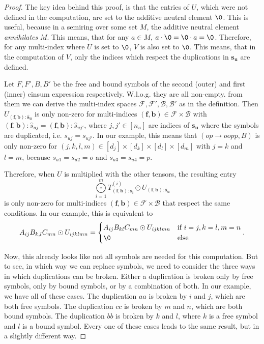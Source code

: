 \begin{proof}
    \small
    The key idea behind this proof, is that the entries of $U$, which were not defined in the computation, are set to the additive neutral element $\0$.
    This is useful, because in a semiring over some set $M$, the additive neutral element \textit{annihilates} $M$.
    This means, that for any $a \in M$, $a \cdot \0 = \0 \cdot a = \0$.
    Therefore, for any multi-index where $U$ is set to $\0$, $V$ is also set to $\0$.
    This means, that in the computation of $V$, only the indices which respect the duplications in $\bm{s_u}$ are defined.

    Let $F, F', B, B'$ be the free and bound symbols of the second (outer) and first (inner) einsum expression respectively.
    W.l.o.g. they are all non-empty.
    from them we can derive the multi-index spaces $\mathcal{F}, \mathcal{F}', \mathcal{B}, \mathcal{B}'$ as in the definition.
    Then $U_{(\bm{f}, \bm{b}): \bm{\hat{s}_u}}$ is only non-zero for multi-indices $(\bm{f}, \bm{b}) \in \mathcal{F} \times \mathcal{B}$ with $(\bm{f}, \bm{b}):\hat{s}_{uj} = (\bm{f}, \bm{b}):\hat{s}_{uj'}$, where $j,j' \in [n_u]$ are indices of $\bm{s_u}$ where the symbols are duplicated, i.e. $s_{uj} = s_{uj'}$.
    In our example, this means that $(op \rightarrow oopp, B)$ is only non-zero for $(j,k,l,m) \in [d_j] \times [d_k] \times [d_l] \times [d_m]$ with $j = k$ and $l = m$, because $s_{u1} = s_{u2} = o$ and $s_{u3} = s_{u4} = p$.

    Therefore, when $U$ is multiplied with the other tensors, the resulting entry
    $$\bigodot\limits_{i = 1}^{m} T^{(i)}_{(\bm{f}, \bm{b}): \bm{s_i}} \odot U_{(\bm{f}, \bm{b}): \bm{\hat{s}_u}}$$
    is only non-zero for multi-indices $(\bm{f}, \bm{b}) \in \mathcal{F} \times \mathcal{B}$ that respect the same conditions.
    In our example, this is equivalent to
    $$A_{ij} B_{k,l} C_{mn} \odot U_{ijklmn} = \begin{cases}
            A_{ij} B_{kl} C_{mn} \odot U_{ijklmn} & \text{if } i = j, k = l, m = n \\
            \0                                    & \text{else}
        \end{cases}.$$

    Now, this already looks like not all symbols are needed for this computation.
    But to see, in which way we can replace symbols, we need to consider the three ways in which duplications can be broken.
    Either a duplication is broken only by free symbols, only by bound symbols, or by a combination of both.
    In our example, we have all of these cases.
    The duplication $aa$ is broken by $i$ and $j$, which are both free symbols.
    The duplication $cc$ is broken by $m$ and $n$, which are both bound symbols.
    The duplication $bb$ is broken by $k$ and $l$, where $k$ is a free symbol and $l$ is a bound symbol.
    Every one of these cases leads to the same result, but in a slightly different way.


\end{proof}
